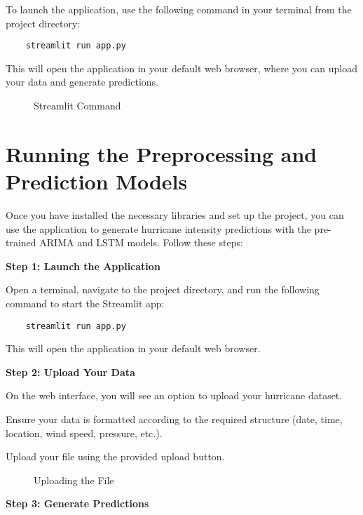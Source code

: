 To launch the application, use the following command in your terminal from the project directory:

\begin{verbatim}
	streamlit run app.py
\end{verbatim}

This will open the application in your default web browser, where you can upload your data and generate predictions.

\begin{figure}[h]
	\centering
	\caption{Streamlit Command}
\end{figure}




\section{Running the Preprocessing and Prediction Models}

Once you have installed the necessary libraries and set up the project, you can use the application to generate hurricane intensity predictions with the pre-trained ARIMA and LSTM models. Follow these steps:

\textbf{Step 1: Launch the Application}

Open a terminal, navigate to the project directory, and run the following command to start the Streamlit app:

\begin{verbatim}
	streamlit run app.py
\end{verbatim}

This will open the application in your default web browser.

\textbf{Step 2: Upload Your Data}

On the web interface, you will see an option to upload your hurricane dataset.

Ensure your data is formatted according to the required structure (date, time, location, wind speed, pressure, etc.).

Upload your file using the provided upload button.

\begin{figure}[h]
	\centering
	\caption{Uploading the File}
\end{figure}


\textbf{Step 3: Generate Predictions}

